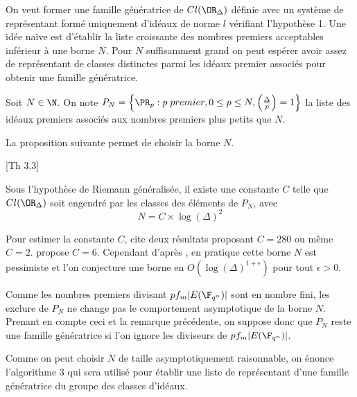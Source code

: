 On veut former une famille génératrice de $Cl(\OR_{\Delta})$ définie avec un système de représentant formé uniquement d'idéaux de norme $l$ vérifiant l'hypothèse 1. Une idée naïve est d'établir la liste croissante des nombres premiers acceptables inférieur à une borne $N$. Pour $N$ suffisamment grand on peut espérer avoir assez de représentant de classes distinctes parmi les idéaux premier associés pour obtenir une famille génératrice.

\begin{Def}
	Soit $N\in\N$. On note $P_{N} = \left\lbrace \PR_{p} : p \; premier, 0\leq p\leq N, \left( \frac{\Delta}{p}\right) = 1\right\rbrace$ la liste des idéaux premiers associés aux nombres premiers plus petits que $N$. 
\end{Def}

La proposition suivante permet de choisir la borne $N$.

\begin{Prop}\cite{Seysen}[Th 3.3]
	
	Sous l'hypothèse de Riemann généralisée, il existe une constante $C$ telle que $Cl(\OR_{\Delta})$ soit engendré par les classes des éléments de $P_{N}$, avec 
	\begin{equation*}
		N = C\times \log(\Delta)^{2}
	\end{equation*}
	
\end{Prop}

\begin{Rem}
	Pour estimer la constante $C$, \cite{Seysen} cite deux résultats proposant $C= 280$ ou même $C = 2$. \cite{Coh00} propose $C = 6$. Cependant d'après \cite{Coh00}, en pratique cette borne $N$ est pessimiste et l'on conjecture une borne en $O(\log(\Delta)^{1+\epsilon})$ pour tout $\epsilon > 0$.
\end{Rem}

\begin{Rem}
	Comme les nombres premiers divisant $pf_{m}|E(\F_{q^{n}})|$ sont en nombre fini, les exclure de $P_{N}$ ne change pas le comportement asymptotique de la borne $N$. Prenant en compte ceci et la remarque précédente, on suppose donc que $P_{N}$ reste une famille génératrice si l'on ignore les diviseurs de $pf_{m}|E(\F_{q^{n}})|$. 
\end{Rem} 

Comme on peut choisir $N$ de taille asymptotiquement raisonnable, on énonce  l'algorithme 3 qui sera utilisé pour établir une liste de représentant d'une famille génératrice du groupe des classes d'idéaux. 


